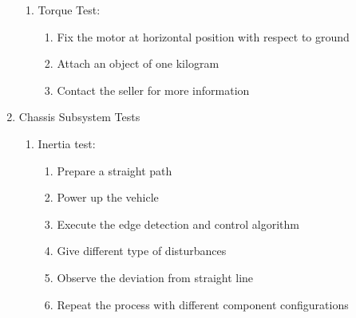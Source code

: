 \documentclass[a4paper,12pt]{article}
\begin{document}
\begin{enumerate}
\begin{enumerate}

\item {Torque Test:} 

\begin{enumerate}

\item Fix the motor at horizontal position with respect to ground  

\item Attach an object of one kilogram  

\item Contact the seller for more information 

\end{enumerate}

\end{enumerate}










\item {Chassis Subsystem Tests}

\begin{enumerate}

\item Inertia test: 

\begin{enumerate}

\item Prepare a straight path

\item Power up the vehicle 

\item Execute the edge detection and control algorithm

\item Give different type of disturbances 

\item Observe the deviation from straight line

\item Repeat the process with different component configurations

\end{enumerate} 

\end{enumerate}









\end{enumerate}
\end{document}
